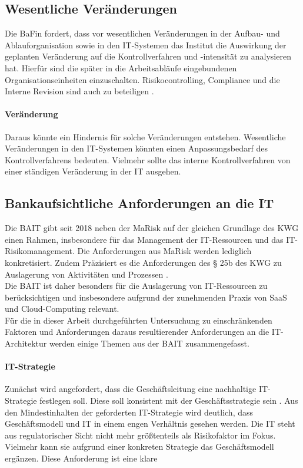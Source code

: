 \subsection{Wesentliche Veränderungen}
Die BaFin fordert, dass vor wesentlichen Veränderungen in der Aufbau- und Ablauforganisation sowie in den IT-Systemen das Institut die Auswirkung der geplanten Veränderung auf die Kontrollverfahren und -intensität zu analysieren hat. Hierfür sind die später in die Arbeitsabläufe eingebundenen Organisationseinheiten einzuschalten. Risikocontrolling, Compliance und die Interne Revision sind auch zu beteiligen \cite{MaRisk:2017}. 
%
\paragraph{Veränderung}
Daraus könnte ein Hindernis für solche Veränderungen entstehen. Wesentliche Veränderungen in den IT-Systemen könnten einen Anpassungsbedarf des Kontrollverfahrens bedeuten. Vielmehr sollte das interne Kontrollverfahren von einer ständigen Veränderung in der IT ausgehen.

\subsection{Bankaufsichtliche Anforderungen an die IT}
Die \ac{BAIT} gibt seit 2018 neben der \ac{MaRisk} auf der gleichen Grundlage des \ac{KWG} einen  Rahmen, insbesondere für das Management der IT-Ressourcen und das IT-Risikomanagement. Die Anforderungen aus \ac{MaRisk} werden lediglich konkretisiert. Zudem Präzisiert es die Anforderungen des § 25b des
\ac{KWG} zu Auslagerung von Aktivitäten und Prozessen \cite{BAIT:2018}.
\\
Die \ac{BAIT} ist daher besonders für die Auslagerung von IT-Ressourcen zu berücksichtigen und insbesondere aufgrund der zunehmenden Praxis von \ac{SaaS} und Cloud-Computing relevant.
\\
Für die in dieser Arbeit durchgeführten Untersuchung zu einschränkenden Faktoren und Anforderungen daraus resultierender Anforderungen an die IT-Architektur werden einige Themen aus der \ac{BAIT} zusammengefasst.


\paragraph{IT-Strategie} Zunächst wird angefordert, dass die Geschäftsleitung eine nachhaltige IT-Strategie festlegen soll. Diese soll konsistent mit der Geschäftsstrategie sein \cite{BAIT:2018}. 
Aus den Mindestinhalten der geforderten IT-Strategie wird deutlich, dass Geschäftsmodell und IT in einem engen Verhältnis gesehen werden. Die IT steht aus regulatorischer Sicht nicht mehr größtenteils als Risikofaktor im Fokus. Vielmehr kann sie aufgrund einer konkreten Strategie das Geschäftsmodell ergänzen. Diese Anforderung ist eine klare 

